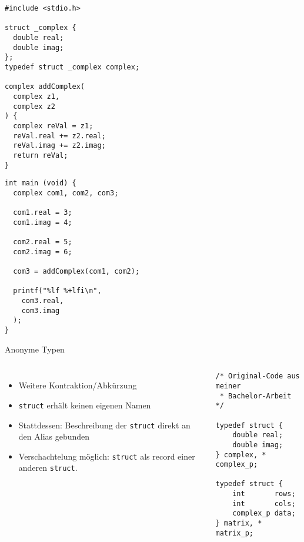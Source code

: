 \begin{frame}[fragile]
%
%
\begin{codebox}
\begin{verbatim}
#include <stdio.h>

struct _complex {
  double real;
  double imag;
};
typedef struct _complex complex;

complex addComplex(
  complex z1, 
  complex z2
) {
  complex reVal = z1;
  reVal.real += z2.real;
  reVal.imag += z2.imag;
  return reVal;
}

\end{verbatim}
\end{codebox}
%
\begin{codebox}[... Fortsetzung]
\begin{verbatim}
int main (void) {
  complex com1, com2, com3;
  
  com1.real = 3;
  com1.imag = 4;
  
  com2.real = 5;
  com2.imag = 6;
  
  com3 = addComplex(com1, com2);
  
  printf("%lf %+lfi\n", 
    com3.real, 
    com3.imag
  );
}
\end{verbatim}
\end{codebox}
%
\end{frame}


\begin{frame}[fragile]{Anonyme Typen}
%
\begin{columns}[T]
\begin{itemize}
\item Weitere Kontraktion/Abkürzung
\item \texttt{struct} erhält keinen eigenen Namen
\item Stattdessen: Beschreibung der \texttt{struct} direkt an den Alias gebunden
\item Verschachtelung möglich: \texttt{struct} als record einer anderen \texttt{struct}.
\end{itemize}
%
\vspace{-10pt}
\begin{codebox}
\begin{verbatim}
/* Original-Code aus meiner
 * Bachelor-Arbeit */
 
typedef struct {
	double real;
	double imag;
} complex, * complex_p;

typedef struct {
	int       rows;
	int       cols;
	complex_p data;
} matrix, * matrix_p;
\end{verbatim}
\end{codebox}
%
\end{columns}
%
\end{frame}

